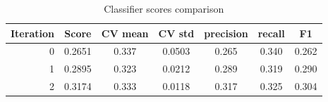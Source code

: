 \documentclass[11pt]{article}
\begin{document}
{\begin{table}[htb]
\begin{center}
\begin{tabular}{ |r|c|c|c|c|c|c| }
\hline
Iteration 	& Score  & CV mean & CV std & precision & recall & F1 \\ \hline
0			& 0.2651 & 0.337   & 0.0503 & 0.265 	& 0.340  & 0.262 \\ \hline
1			& 0.2895 & 0.323   & 0.0212 & 0.289 	& 0.319  & 0.290 \\ \hline
2 			& 0.3174 & 0.333   & 0.0118 & 0.317 	& 0.325  & 0.304 \\ \hline
\end{tabular}
\caption{Classifier scores comparison}
\end{center}
\end{table}
\FloatBarrier

}
\end{document}
